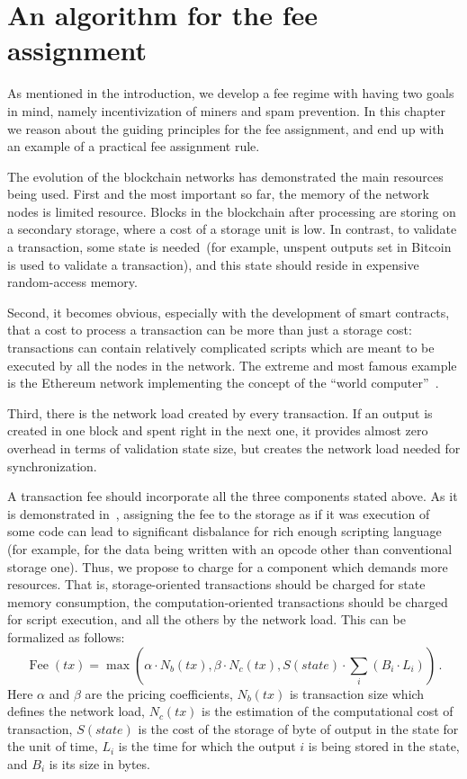 \documentclass[]{llncs}   %
\begin{document}
\section{An algorithm for the fee assignment}
\label{sec:algorithm}

As mentioned in the introduction, we develop a fee regime with having two goals
in mind, namely incentivization of miners and spam prevention.  In this chapter
we reason about the guiding  principles for the fee assignment, and end up with
an example of a practical fee assignment rule.

The evolution of the blockchain networks has demonstrated the main resources
being used. First and the most important so far, the memory of the network nodes 
is limited resource. Blocks in the blockchain after processing are storing on a 
secondary storage, where a cost of a storage unit is low. In contrast, to validate a 
transaction, some state is needed~(for example, unspent outputs set in Bitcoin is used 
to validate a transaction), and this state should reside in expensive random-access memory.   

Second, it becomes obvious, especially with the development of smart contracts,
that a cost to process a transaction can be more than just a storage cost:
transactions can contain relatively complicated scripts which are meant to be
executed by all the nodes in the network. The extreme and most famous example is
the Ethereum network implementing the concept of the ``world computer''~\cite{ethyp}. 

Third, there is the network load created by every transaction. If an output is
created in one block and spent right in the next one, it provides almost zero
overhead in terms of validation state size, but creates the network load needed
for synchronization.

A transaction fee should incorporate all the three components stated above.  As
it is demonstrated in~\cite{Earlz2017}, assigning the fee to the storage as if
it was execution of some code can lead to significant disbalance for rich enough
scripting language (for example, for the data being written with an opcode other
than conventional storage one).  Thus, we propose to charge for a component
which demands more resources. That is, storage-oriented transactions should be
charged for state memory consumption, the computation-oriented transactions
should be charged for script execution, and all the others by the network load.
This can be formalized as follows:
\begin{equation}
    \operatorname{Fee}(tx) = \max\left(\alpha \cdot N_b(tx), \beta \cdot N_c(tx),
    S(state) \cdot \sum_i (B_i \cdot L_i) \right)\,.
    \label{eq:max}
\end{equation}
Here $\alpha$ and $\beta$ are the pricing coefficients, $N_b(tx)$ is transaction size 
which defines the network load, $N_c(tx)$ is the estimation of the computational 
cost of transaction, $S(state)$ is the cost of the storage of byte of output in the 
state for the unit of time, $L_i$ is the time for which the output $i$ is being stored 
in the state, and $B_i$ is its size in bytes.
\end{document}

